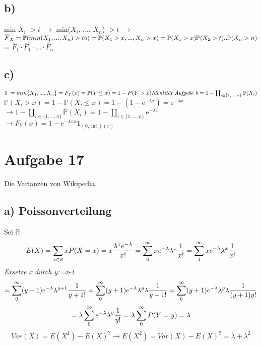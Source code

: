 \documentclass[11pt]{article} %
\begin{document}
{\subsection*{b)}
{min $X_i$ $>t$ } $\rightarrow$ min($X_i$, ..., $X_n$) $>t$ $\rightarrow$ $\overline{F}_{X} = \mathbb{P}(min(X_1,...,X_n) >t5)=\\ \mathbb{P}(X_1>x,...,X_n >x)\\ = \mathbb{P}(X_1 >x)\mathbb{P} (X_2 >t) .. \mathbb{P}(X_n>n)$\\ = $\overline{F}_1 \cdot \overline{F}_1 \cdot ... \cdot  \overline{F}_n $ 

\subsection{c)} $Y = min \{X_1, ..., X_n \} = F_Y(x)=\mathbb{P}(Y \leq x) = 1 - P(Y >x)\\\textit{Identität Aufgabe b} \\= 1- \coprod_{i \in  \{1,...,n\}} \mathbb{P}(X_i) $ \\
$\mathbb{P}(X_i>x)=1 - \mathbb{P}(X_i \leq x) = 1 - (1 - \mathrm{e}^{-\lambda x}) = \mathrm{e}^{-\lambda x} $\\
$\rightarrow 1- \coprod_{i \in  \{1,...,n\}} \mathbb{P}(X_i) = 1- \coprod_{i \in  \{1,...,n\}} \mathrm{e}^{-\lambda x}  $ \\
$\rightarrow F_Y(x) = 1- \mathrm{e}^{-\lambda x n} \textbf{1}_{(0, \inf) (x)  }  $
\section*{\textbf Aufgabe 17}
Die Varianzen von Wikipedia.
\subsection*{a) Poissonverteilung}
Sei $\mathbb{R}$   
$$ E(X) =
\sum_{x \in \mathbb{R} } x P(X = x) \\
= x \frac{ \lambda^x e^{-\lambda}}{x!} \\
= \sum_{0}^{\infty} x e^{-\lambda} \lambda^x \frac{1}{x!} \\
= \sum_{1}^{\infty} x e^{-\lambda} \lambda^x \frac{1}{x!} \\
$$
 \textit{Ersetze x durch y:=x-1 }
$$
= \sum_{0}^{\infty} (y+1) e^{-\lambda} \lambda^{y+1} \frac{1}{y+1!} \\
= \sum_{0}^{\infty} (y+1) e^{-\lambda} \lambda^{y} \lambda \frac{1}{y+1!} \\
= \sum_{0}^{\infty} (y+1) e^{-\lambda} \lambda^{y} \lambda \frac{1}{(y+1) y!} \\ $$
$$
= \lambda \sum_{0}^{\infty}  e^{-\lambda} \lambda^{y}  \frac{1}{y!} = \lambda \sum_{0}^{\infty} P(Y=y)  \\
= \lambda	
$$
\noindent\makebox[\linewidth]{\rule{\textwidth}{0.4pt}}
$$ Var(X)= E(X^2) -E(X)^2 
\rightarrow  E(X^2) = Var (X) - E(X)^2 = \lambda + \lambda^2 $$

}
\end{document}
